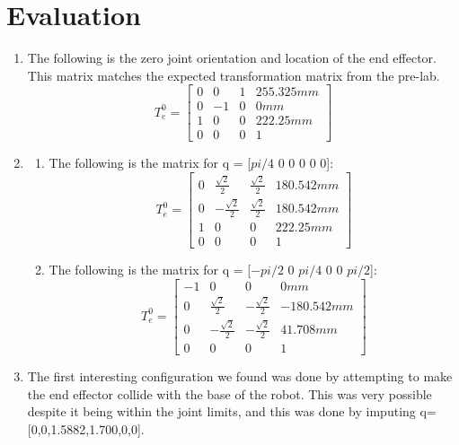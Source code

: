 \documentclass[12pt]{article}
\begin{document}
\section{Evaluation}
\begin{enumerate}
\item The following is the zero joint orientation and location of the end effector. This matrix matches the expected transformation matrix from the pre-lab.
\begin{equation}	
	T^{0}_{e} = \begin{bmatrix}
	0 & 0 & 1 & 255.325mm\\
	0 & -1 & 0 & 0mm\\
	1 & 0 & 0 & 222.25mm\\
	0 & 0 & 0 & 1
	\end{bmatrix}
\end{equation}
\item
\begin{enumerate}
\item The following is the matrix for q = [$pi/4$ 0 0 0 0 0]:
\begin{equation}	
	T^{0}_{e} = \begin{bmatrix}
	0 & \frac{\sqrt{2}}{2} & \frac{\sqrt{2}}{2} & 180.542mm\\
	0 & -\frac{\sqrt{2}}{2} & \frac{\sqrt{2}}{2} & 180.542mm\\
	1 & 0 & 0 & 222.25mm\\
	0 & 0 & 0 & 1
	\end{bmatrix}
\end{equation}
\item The following is the matrix for q = [$-pi/2$ 0 $pi/4$ 0 0 $pi/2$]:
\begin{equation}	
	T^{0}_{e} = \begin{bmatrix}
	-1 & 0 & 0 & 0mm\\
	0 & \frac{\sqrt{2}}{2} & -\frac{\sqrt{2}}{2} & -180.542mm\\
	0 & -\frac{\sqrt{2}}{2} & -\frac{\sqrt{2}}{2} & 41.708mm\\
	0 & 0 & 0 & 1
	\end{bmatrix}
\end{equation}
\end{enumerate}
\item 
\par{
The first interesting configuration we found was done by attempting to make the end effector collide with the base of the robot. This was very possible despite it being within the joint limits, and this was done by imputing  q=[0,0,1.5882,1.700,0,0].  
}
\end{enumerate}
\end{document}
